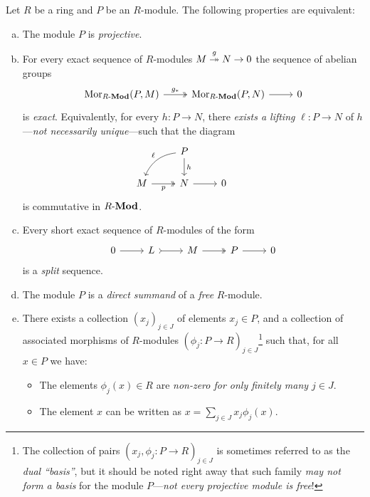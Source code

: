 \begin{proposition}
\label{prop:equivalences-projective-module}
Let \(R\) be a ring and \(P\) be an \(R\)-module. The following properties are equivalent:
\begin{enumerate}[(a)]\setlength\itemsep{0em}
\item The module \(P\) is \emph{projective}.

\item For every exact sequence of \(R\)-modules \(M \overset{g}{\twoheadrightarrow} N \to 0\)
  the sequence of abelian groups
  \[
  \begin{tikzcd}
  \Hom_{\Mod{R}}(P, M) \ar[r, "g_{*}", two heads]
  &\Hom_{\Mod{R}}(P, N) \ar[r] &0
  \end{tikzcd}
  \]
  is \emph{exact}. Equivalently, for every \(h: P \to N\), there \emph{exists a
    lifting} \(\ell: P \to N\) of \(h\)---\emph{not necessarily unique}---such
  that the diagram
  \[
  \begin{tikzcd}
  &P \ar[d, "h"] \ar[dl, bend right, "\ell"'] & & \\
  M \ar[r, two heads, "p"'] &N \ar[r] &0
  \end{tikzcd}
  \]
  is commutative in \({R\text{-}\textbf{Mod}}\).

\item Every short exact sequence of \(R\)-modules of the form
  \[
  \begin{tikzcd}
  0 \ar[r] &L \ar[r, tail] &M \ar[r, two heads] &P \ar[r] &0
  \end{tikzcd}
  \]
  is a \emph{split} sequence.

\item The module \(P\) is a \emph{direct summand} of a \emph{free} \(R\)-module.

\item There exists a collection \((x_j)_{j \in J}\) of elements \(x_j \in P\),
  and a collection of associated morphisms of \(R\)-modules
  \((\phi_j: P \to R)_{j \in J}\)\footnote{The collection of pairs
    \((x_j, \phi_j: P \to R)_{j \in J}\) is sometimes referred to as the
    \emph{dual ``basis''}, but it should be noted right away that such family
    \emph{may not form a basis} for the module \(P\)---\emph{not every
      projective module is free}!} such that, for all \(x \in P\) we have:
\begin{itemize}\setlength\itemsep{0em}
\item The elements \(\phi_j(x) \in R\) are \emph{non-zero for only finitely many
  \(j \in J\)}.
\item The element \(x\) can be written as \(x = \sum_{j \in J} x_j \phi_j(x)\).
\end{itemize}
\end{enumerate}
\end{proposition}

